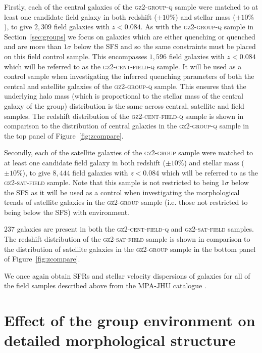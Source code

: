 \documentclass[useAMS,usenatbib]{mn2e}
\def\minor		{\color{minorcol}}
\begin{document}
Firstly, each of the central galaxies of the \textsc{gz2-group-q} sample were matched to at least one candidate field galaxy in both redshift ($\pm10\%$) and stellar mass ($\pm10\%$), to give $2,309$ field galaxies with $z < 0.084$. As with the \textsc{gz2-group-q} sample in Section~\ref{sec:groups} we focus on galaxies which are either quenching or quenched and are more than $1\sigma$ below the SFS and so the same constraints must be placed on this field control sample. This encompasses $1,596$ field galaxies with $z < 0.084$ which will be referred to as the \textsc{gz2-cent-field-q} sample. It will be used as a control sample when investigating the inferred quenching parameters of both the central and satellite galaxies of the \textsc{gz2-group-q} sample. {\minor This ensures that the underlying halo mass (which is proportional to the stellar mass of the central galaxy of the group) distribution is the same across central, satellite and field samples}. The redshift distribution of the \textsc{gz2-cent-field-q} sample is shown in comparison to the distribution of central galaxies in the \textsc{gz2-group-q} sample in the top panel of Figure~\ref{fig:zcompare}. 

Secondly, each of the satellite galaxies of the \textsc{gz2-group} sample were matched to at least one candidate field galaxy in both redshift ($\pm10\%$) and stellar mass ($\pm10\%$), to give $8,444$ field galaxies with $z < 0.084$ which will be referred to as the \textsc{gz2-sat-field} sample.  Note that this sample is not restricted to being $1\sigma$ below the SFS as it will be used as a control when investigating the morphological trends of satellite galaxies in the \textsc{gz2-group} sample (i.e. those not restricted to being below the SFS) with environment. 

$237$ galaxies are present in both the \textsc{gz2-cent-field-q} and \textsc{gz2-sat-field} samples. The redshift distribution of the \textsc{gz2-sat-field} sample is shown in comparison to the distribution of satellite galaxies in the \textsc{gz2-group} sample in the bottom panel of Figure~\ref{fig:zcompare}.

We once again obtain SFRs and stellar velocity dispersions of galaxies for all of the field samples described above from the MPA-JHU catalogue \citep{kauffmann03, brinchmann04}.



\section{Effect of the group environment on detailed morphological structure}\label{sec:morphfrac}
\end{document}
